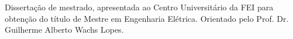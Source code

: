 \begin{folhaderosto}
Dissertação de mestrado, apresentada ao Centro Universitário da FEI para obtenção do título de Mestre em Engenharia Elétrica. Orientado pelo Prof. Dr. Guilherme Alberto Wachs Lopes.
\end{folhaderosto}

\fichacatalografica
\folhadeaprovacao


%


